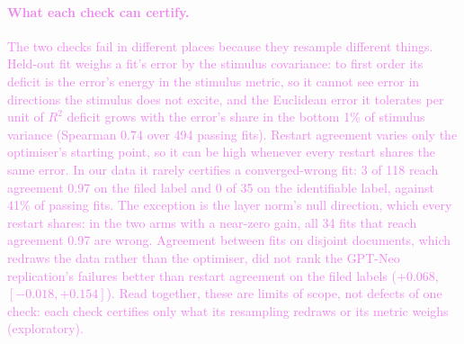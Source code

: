 \documentclass[10pt]{article}
\newcommand{\draft}[1]{\textcolor{violet}{#1}}
\begin{document}
\draft{\paragraph{What each check can certify.} The two checks fail in different places because
they resample different things. Held-out fit weighs a fit's error by the stimulus covariance: to
first order its deficit is the error's energy in the stimulus metric, so it cannot see error in
directions the stimulus does not excite, and the Euclidean error it tolerates per unit of $R^2$
deficit grows with the error's share in the bottom 1\% of stimulus variance (Spearman 0.74 over
494 passing fits). Restart agreement varies only the optimiser's starting point, so it can be high
whenever every restart shares the same error. In our data it rarely certifies a converged-wrong
fit: 3 of 118 reach agreement 0.97 on the filed label and 0 of 35 on the identifiable label,
against 41\% of passing fits. The exception is the layer norm's null direction, which every restart
shares: in the two arms with a near-zero gain, all 34 fits that reach agreement 0.97 are wrong.
Agreement between fits on disjoint documents, which redraws the data rather than the optimiser,
did not rank the GPT-Neo replication's failures better than restart agreement on the filed labels
($+0.068$, $[-0.018, +0.154]$). Read together, these are limits of scope, not defects of one
check: each check certifies only what its resampling redraws or its metric weighs (exploratory).}

\end{document}
